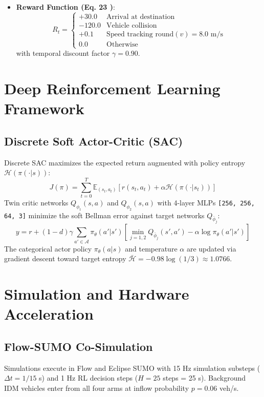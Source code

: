 \documentclass[journal]{IEEEtran}
\begin{document}
\begin{itemize}
    \item \textbf{Reward Function (Eq. 23 \cite{xiao2024decision})}:
    \begin{equation}
        R_t = \begin{cases}
            +30.0 & \text{Arrival at destination} \\
            -120.0 & \text{Vehicle collision} \\
            +0.1 & \text{Speed tracking } \text{round}(v) = 8.0 \text{ m/s} \\
            0.0 & \text{Otherwise}
        \end{cases}
    \end{equation}
    with temporal discount factor $\gamma = 0.90$.
\end{itemize}

\section{Deep Reinforcement Learning Framework}
\subsection{Discrete Soft Actor-Critic (SAC)}
Discrete SAC maximizes the expected return augmented with policy entropy $\mathcal{H}(\pi(\cdot|s))$:
\begin{equation}
    J(\pi) = \sum_{t=0}^{T} \mathbb{E}_{(s_t, a_t)} \left[ r(s_t, a_t) + \alpha \mathcal{H}(\pi(\cdot|s_t)) \right]
\end{equation}
Twin critic networks $Q_{\phi_1}(s, a)$ and $Q_{\phi_2}(s, a)$ with 4-layer MLPs \texttt{[256, 256, 64, 3]} minimize the soft Bellman error against target networks $Q_{\bar{\phi}_j}$:
\begin{equation}
    y = r + (1 - d)\gamma \sum_{a' \in \mathcal{A}} \pi_\theta(a'|s') \left[ \min_{j=1,2} Q_{\bar{\phi}_j}(s', a') - \alpha \log \pi_\theta(a'|s') \right]
\end{equation}
The categorical actor policy $\pi_\theta(a|s)$ and temperature $\alpha$ are updated via gradient descent toward target entropy $\bar{\mathcal{H}} = -0.98 \log(1/3) \approx 1.0766$.

\section{Simulation and Hardware Acceleration}
\subsection{Flow-SUMO Co-Simulation}
Simulations execute in Flow and Eclipse SUMO with 15 Hz simulation substeps ($\Delta t = 1/15$ s) and 1 Hz RL decision steps ($H = 25$ steps = 25 s). Background IDM vehicles enter from all four arms at inflow probability $p = 0.06$ veh/s.
\end{document}
